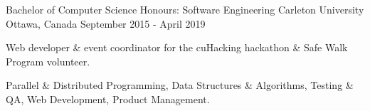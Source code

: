 
\begin{cventries}
	\cventry
		{Bachelor of Computer Science Honours: Software Engineering}
		{Carleton University}
		{Ottawa, Canada}
		{September 2015 - April 2019}
		{\begin{cvitems}
			\item Web developer \& event coordinator for the cuHacking hackathon \& Safe Walk Program volunteer.
			\item Parallel \& Distributed Programming, Data Structures \& Algorithms, Testing \& QA, Web Development, Product Management.
		\end{cvitems}}
\end{cventries}
